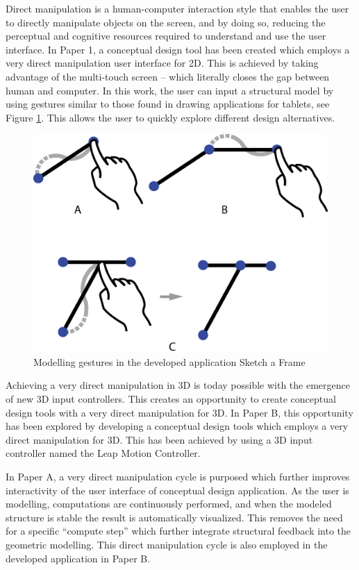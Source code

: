 Direct manipulation is a human-computer interaction style that enables the user to directly manipulate objects on the screen, and by doing so, reducing the perceptual and cognitive resources required to understand and use the user interface. In Paper 1, a conceptual design tool has been created which employs a very direct manipulation user interface for 2D. This is achieved by taking advantage of the multi-touch screen – which literally closes the gap between human and computer. In this work, the user can input a structural model by using gestures similar to those found in drawing applications for tablets, see Figure \ref{fig:interaction}. This allows the user to quickly explore different design alternatives.

\begin{figure}
  \includegraphics[width=330pt]{graphics/interaction.eps}
  \caption{Modelling gestures in the developed application Sketch a Frame}
  \label{fig:interaction}
\end{figure}

Achieving a very direct manipulation in 3D is today possible with the emergence of new 3D input controllers. This creates an opportunity to create conceptual design tools with a very direct manipulation for 3D. In Paper B, this opportunity has been explored by developing a conceptual design tools which employs a very direct manipulation for 3D. This has been achieved by using a 3D input controller named the Leap Motion Controller. 

In Paper A, a very direct manipulation cycle is purposed which further improves interactivity of the user interface of conceptual design application. As the user is modelling, computations are continuously performed, and when the modeled structure is stable the result is automatically visualized. This removes the need for a specific “compute step” which further integrate structural feedback into the geometric modelling. This direct manipulation cycle is also employed in the developed application in Paper B.

